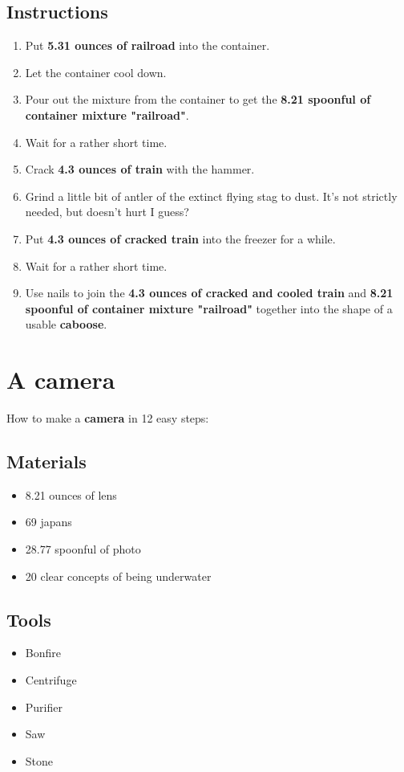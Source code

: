 \documentclass{article}
\begin{document}
\subsection{Instructions}\begin{enumerate}
\item 
Put \textbf{5.31 ounces of railroad} into the container.
\item 
Let the container cool down.
\item 
Pour out the mixture from the container to get the \textbf{8.21 spoonful of container mixture "railroad"}.
\item 
Wait for a rather short time.
\item 
Crack \textbf{4.3 ounces of train} with the hammer.
\item 
Grind a little bit of antler of the extinct flying stag to dust. It's not strictly needed, but doesn't hurt I guess?
\item 
Put \textbf{4.3 ounces of cracked train} into the freezer for a while.
\item 
Wait for a rather short time.
\item 
Use nails to join the \textbf{4.3 ounces of cracked and cooled train} and \textbf{8.21 spoonful of container mixture "railroad"} together into the shape of a usable \textbf{caboose}.
\end{enumerate}
\newpage
\section{A camera}How to make a \textbf{camera} in 12 easy steps:

\subsection{Materials}\begin{itemize}
\item 
8.21 ounces of lens
\item 
69 japans
\item 
28.77 spoonful of photo
\item 
20 clear concepts of being underwater
\end{itemize}
\subsection{Tools}\begin{itemize}
\item 
Bonfire
\item 
Centrifuge
\item 
Purifier
\item 
Saw
\item 
Stone
\end{itemize}
\end{document}
